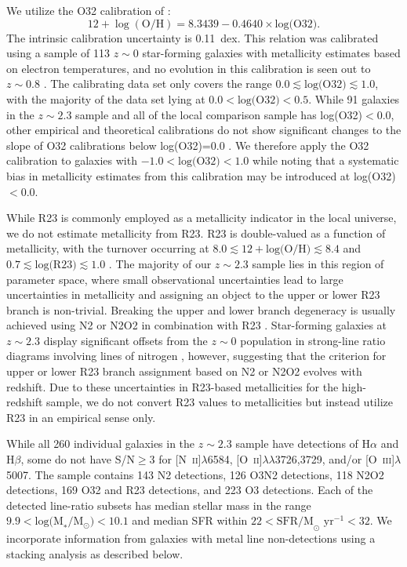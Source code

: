 \documentclass[iop,twocolappendix]{emulateapj}
\newcommand{\ii}{~\textsc{ii}}
\newcommand{\iii}{~\textsc{iii}}
\begin{document}
We utilize the O32 calibration of \citet{jon15}:
\begin{equation}\label{eq:j15o32}
12+\log{(\mbox{O/H})}=8.3439-0.4640\times\mbox{log(O32)} .
\end{equation}
  The intrinsic calibration uncertainty is 0.11~dex.
  This relation was calibrated using a sample of 113 $z\sim0$ star-forming galaxies with
 metallicity estimates based on electron temperatures, and no evolution in this
 calibration is seen out to $z\sim0.8$ \citep{jon15}.  The calibrating data set only
 covers the range $0.0\lesssim\text{log(O32)}\lesssim1.0$, with the majority of the
 data set lying at $0.0<\text{log(O32)}<0.5$.  While 91 galaxies in
 the $z\sim2.3$ sample and all of the local comparison sample has log(O32)$<$0.0,
 other empirical and theoretical calibrations do not show significant changes to
 the slope of O32 calibrations below log(O32)=0.0 \citep{mai08,cur17}.  We therefore
 apply the \citet{jon15} O32 calibration to galaxies with $-1.0<\text{log(O32)}<1.0$ while
 noting that a systematic bias in metallicity estimates from this calibration
 may be introduced at log(O32)$<$0.0.

While R23 is commonly employed as a metallicity indicator in the local universe, we do not estimate metallicity from R23.
  R23 is double-valued as a function of metallicity, with the turnover occurring at $8.0\lesssim12+\mbox{log(O/H)}\lesssim8.4$
 and $0.7\lesssim\mbox{log(R23)}\lesssim1.0$ \citep[e.g.,][]{mcg91,kew02,pil05}.
  The majority of our $z\sim2.3$ sample lies in this region of parameter space, where small observational uncertainties
 lead to large uncertainties in metallicity and assigning an object to the upper or lower R23 branch is non-trivial.
  Breaking the upper and lower branch degeneracy is usually achieved using N2 or N2O2 in combination with R23
 \citep[e.g.,][]{kew02}.  Star-forming galaxies at $z\sim2.3$ display significant offsets from the $z\sim0$ population
 in strong-line ratio diagrams involving lines of nitrogen \citep{mas14,ste14,sha15,san16a}, however, suggesting that the criterion
 for upper or lower R23 branch assignment based on N2 or N2O2 evolves with redshift.
  Due to these uncertainties in R23-based metallicities for the high-redshift sample, we do not convert R23
 values to metallicities but instead utilize R23 in an empirical sense only.

While all 260 individual galaxies in the $z\sim2.3$ sample have detections of H$\alpha$
 and H$\beta$, some do not have S/N$\geq$3 for [N\ii]$\lambda$6584,
 [O\ii]$\lambda\lambda$3726,3729, and/or [O\iii]$\lambda$5007.
  The sample contains 143 N2 detections, 126 O3N2 detections, 118 N2O2 detections,
 169 O32 and R23 detections, and 223 O3 detections.
  Each of the detected line-ratio subsets has median stellar mass in the range
 $9.9<\text{log(M}_*/\text{M}_{\odot})<10.1$ and median SFR within
 $22<\text{SFR/M}_{\odot}\text{ yr}^{-1}<32$.
  We incorporate information from galaxies with metal line non-detections using a
 stacking analysis as described below.
\end{document}
